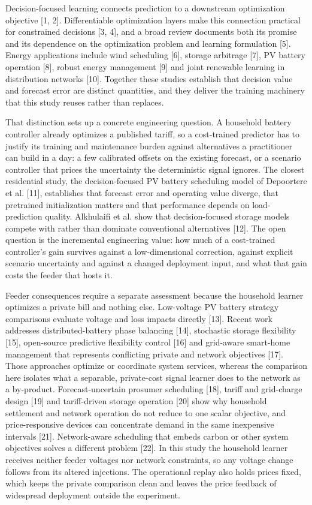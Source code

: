\documentclass[pdflatex,Numbered,sn-basic]{sn-jnl}
\begin{document}
Decision-focused learning connects prediction to a downstream optimization objective [1, 2]. Differentiable optimization layers make this connection practical for constrained decisions [3, 4], and a broad review documents both its promise and its dependence on the optimization problem and learning formulation [5]. Energy applications include wind scheduling [6], storage arbitrage [7], PV battery operation [8], robust energy management [9] and joint renewable learning in distribution networks [10]. Together these studies establish that decision value and forecast error are distinct quantities, and they deliver the training machinery that this study reuses rather than replaces.

That distinction sets up a concrete engineering question. A household battery controller already optimizes a published tariff, so a cost-trained predictor has to justify its training and maintenance burden against alternatives a practitioner can build in a day: a few calibrated offsets on the existing forecast, or a scenario controller that prices the uncertainty the deterministic signal ignores. The closest residential study, the decision-focused PV battery scheduling model of Depoortere et al. [11], establishes that forecast error and operating value diverge, that pretrained initialization matters and that performance depends on load-prediction quality. Alkhulaifi et al. show that decision-focused storage models compete with rather than dominate conventional alternatives [12]. The open question is the incremental engineering value: how much of a cost-trained controller's gain survives against a low-dimensional correction, against explicit scenario uncertainty and against a changed deployment input, and what that gain costs the feeder that hosts it.

Feeder consequences require a separate assessment because the household learner optimizes a private bill and nothing else. Low-voltage PV battery strategy comparisons evaluate voltage and loss impacts directly [13]. Recent work addresses distributed-battery phase balancing [14], stochastic storage flexibility [15], open-source predictive flexibility control [16] and grid-aware smart-home management that represents conflicting private and network objectives [17]. Those approaches optimize or coordinate system services, whereas the comparison here isolates what a separable, private-cost signal learner does to the network as a by-product. Forecast-uncertain prosumer scheduling [18], tariff and grid-charge design [19] and tariff-driven storage operation [20] show why household settlement and network operation do not reduce to one scalar objective, and price-responsive devices can concentrate demand in the same inexpensive intervals [21]. Network-aware scheduling that embeds carbon or other system objectives solves a different problem [22]. In this study the household learner receives neither feeder voltages nor network constraints, so any voltage change follows from its altered injections. The operational replay also holds prices fixed, which keeps the private comparison clean and leaves the price feedback of widespread deployment outside the experiment.
\end{document}
